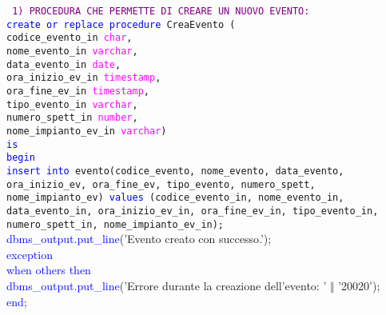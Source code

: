 \documentclass{article}
\begin{document}
    \begin{flushleft}
        \texttt{
        \textcolor{purple}{1) PROCEDURA CHE PERMETTE DI CREARE UN NUOVO EVENTO:} \\
        \hspace*{2em}\textcolor{blue}{create or replace procedure} CreaEvento ( \\
        \hspace*{4em}codice\_evento\_in \textcolor{magenta}{char}, \\
        \hspace*{4em}nome\_evento\_in \textcolor{magenta}{varchar}, \\
        \hspace*{4em}data\_evento\_in \textcolor{magenta}{date}, \\
        \hspace*{4em}ora\_inizio\_ev\_in \textcolor{magenta}{timestamp}, \\
        \hspace*{4em}ora\_fine\_ev\_in \textcolor{magenta}{timestamp}, \\
        \hspace*{4em}tipo\_evento\_in \textcolor{magenta}{varchar}, \\
        \hspace*{4em}numero\_spett\_in \textcolor{magenta}{number}, \\
        \hspace*{4em}nome\_impianto\_ev\_in \textcolor{magenta}{varchar}) \\
        \hspace*{2em}\textcolor{blue}{is} \\
        \hspace*{2em}\textcolor{blue}{begin} \\
        \hspace*{4em}\textcolor{blue}{insert into} evento(codice\_evento, nome\_evento, data\_evento, ora\_inizio\_ev, \hspace*{4em}ora\_fine\_ev, tipo\_evento, numero\_spett, nome\_impianto\_ev) \textcolor{blue}{values} \hspace*{4em}(codice\_evento\_in, nome\_evento\_in, data\_evento\_in, ora\_inizio\_ev\_in, \hspace*{4em}ora\_fine\_ev\_in, tipo\_evento\_in, numero\_spett\_in, nome\_impianto\_ev\_in);
        } \\
        \hspace*{4em}\textcolor{blue}{dbms\_output.put\_line}('Evento creato con successo.'); \\
        \hspace*{2em}\textcolor{blue}{exception} \\
        \hspace*{4em}\textcolor{blue}{when others then} \\
        \hspace*{6em}\textcolor{blue}{dbms\_output.put\_line}('Errore durante la creazione dell'evento: ' $\Vert$ '20020'); \\
        \hspace*{2em}\textcolor{blue}{end}; \\
    \end{flushleft}
\end{document}
